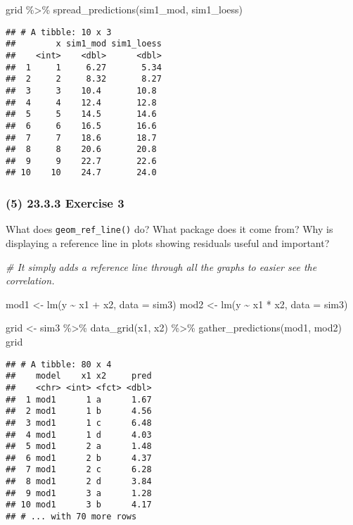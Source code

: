 \documentclass[
]{article}
\newenvironment{Shaded}{\begin{snugshade}}{\end{snugshade}}
\newcommand{\AttributeTok}[1]{\textcolor[rgb]{0.77,0.63,0.00}{#1}}
\newcommand{\CommentTok}[1]{\textcolor[rgb]{0.56,0.35,0.01}{\textit{#1}}}
\newcommand{\FunctionTok}[1]{\textcolor[rgb]{0.00,0.00,0.00}{#1}}
\newcommand{\NormalTok}[1]{#1}
\newcommand{\OtherTok}[1]{\textcolor[rgb]{0.56,0.35,0.01}{#1}}
\newcommand{\SpecialCharTok}[1]{\textcolor[rgb]{0.00,0.00,0.00}{#1}}
\begin{document}
\begin{Shaded}
\begin{Highlighting}[]
\NormalTok{grid }\SpecialCharTok{\%\textgreater{}\%}
  \FunctionTok{spread\_predictions}\NormalTok{(sim1\_mod, sim1\_loess)}
\end{Highlighting}
\end{Shaded}

\begin{verbatim}
## # A tibble: 10 x 3
##        x sim1_mod sim1_loess
##    <int>    <dbl>      <dbl>
##  1     1     6.27       5.34
##  2     2     8.32       8.27
##  3     3    10.4       10.8 
##  4     4    12.4       12.8 
##  5     5    14.5       14.6 
##  6     6    16.5       16.6 
##  7     7    18.6       18.7 
##  8     8    20.6       20.8 
##  9     9    22.7       22.6 
## 10    10    24.7       24.0
\end{verbatim}

\hypertarget{exercise-3}{%
\subsubsection{(5) 23.3.3 Exercise 3}\label{exercise-3}}

What does \texttt{geom\_ref\_line()} do? What package does it come from?
Why is displaying a reference line in plots showing residuals useful and
important?

\begin{Shaded}
\begin{Highlighting}[]
\CommentTok{\# It simply adds a reference line through all the graphs to easier see the correlation.}

\NormalTok{mod1 }\OtherTok{\textless{}{-}} \FunctionTok{lm}\NormalTok{(y }\SpecialCharTok{\textasciitilde{}}\NormalTok{ x1 }\SpecialCharTok{+}\NormalTok{ x2, }\AttributeTok{data =}\NormalTok{ sim3)}
\NormalTok{mod2 }\OtherTok{\textless{}{-}} \FunctionTok{lm}\NormalTok{(y }\SpecialCharTok{\textasciitilde{}}\NormalTok{ x1 }\SpecialCharTok{*}\NormalTok{ x2, }\AttributeTok{data =}\NormalTok{ sim3)}

\NormalTok{grid }\OtherTok{\textless{}{-}}\NormalTok{ sim3 }\SpecialCharTok{\%\textgreater{}\%}
  \FunctionTok{data\_grid}\NormalTok{(x1, x2) }\SpecialCharTok{\%\textgreater{}\%}
  \FunctionTok{gather\_predictions}\NormalTok{(mod1, mod2)}
\NormalTok{grid}
\end{Highlighting}
\end{Shaded}

\begin{verbatim}
## # A tibble: 80 x 4
##    model    x1 x2     pred
##    <chr> <int> <fct> <dbl>
##  1 mod1      1 a      1.67
##  2 mod1      1 b      4.56
##  3 mod1      1 c      6.48
##  4 mod1      1 d      4.03
##  5 mod1      2 a      1.48
##  6 mod1      2 b      4.37
##  7 mod1      2 c      6.28
##  8 mod1      2 d      3.84
##  9 mod1      3 a      1.28
## 10 mod1      3 b      4.17
## # ... with 70 more rows
\end{verbatim}
\end{document}

